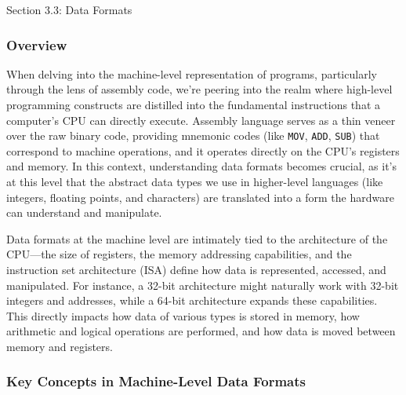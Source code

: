 \begin{notes}{Section 3.3: Data Formats}
    \subsubsection*{Overview}

    When delving into the machine-level representation of programs, particularly through the lens of assembly code, we're peering into the realm where high-level programming constructs are distilled 
    into the fundamental instructions that a computer's CPU can directly execute. Assembly language serves as a thin veneer over the raw binary code, providing mnemonic codes (like \texttt{MOV}, 
    \texttt{ADD}, \texttt{SUB}) that correspond to machine operations, and it operates directly on the CPU's registers and memory. In this context, understanding data formats becomes crucial, as it's 
    at this level that the abstract data types we use in higher-level languages (like integers, floating points, and characters) are translated into a form the hardware can understand and manipulate.

    Data formats at the machine level are intimately tied to the architecture of the CPU—the size of registers, the memory addressing capabilities, and the instruction set architecture (ISA) define 
    how data is represented, accessed, and manipulated. For instance, a 32-bit architecture might naturally work with 32-bit integers and addresses, while a 64-bit architecture expands these 
    capabilities. This directly impacts how data of various types is stored in memory, how arithmetic and logical operations are performed, and how data is moved between memory and registers. \vspace*{1em}

    \subsubsection*{Key Concepts in Machine-Level Data Formats}


\end{notes}
